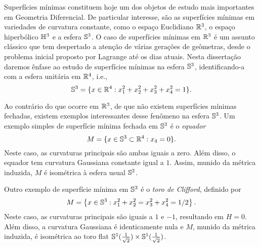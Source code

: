 %

Superf\'icies m\'inimas constituem hoje um dos objetos de estudo
mais importantes em Geometria Diferencial. De particular interesse, 
s\~ao as superf\'icies m\'inimas em variedades de curvatura constante, 
como o espa\c co Euclidiano $\mathbb{R}^3$, o espa\c co hiperb\'olico $\mathbb{H}^3$
e a esfera $\mathbb{S}^3$. O caso de superf\'icies m\'inimas em $\mathbb{R}^3$ \'e um
assunto cl\'assico que tem despertado a aten\c c\~ao de v\'arias 
gera\c c\~oes de ge\^ometras, desde o problema inicial proposto por 
Lagrange at\'e os dias atuais. Nesta disserta\c c\~ao daremos
\^enfase ao estudo de superf\'icies m\'inimas na esfera $\mathbb{S}^3$, 
identificando-a com a esfera unit\'aria em $\mathbb{R}^4$, i.e.,
\[
\mathbb{S}^3=\{x\in\mathbb{R}^4:x_1^2+x_2^2+x_3^2+x_4^2=1\}.
\]



Ao contr\'ario do que ocorre em $\mathbb{R}^3$, de que n\~ao existem 
superf\'icies m\'inimas fechadas, existem exemplos interessantes
desse fen\^omeno na esfera $\mathbb{S}^3$. Um exemplo simples de 
superf\'icie m\'inima fechada em $\mathbb{S}^3$ \'e o {\em equador}
\[
M=\{x\in\mathbb{S}^3\subset\mathbb{R}^4:x_4=0\}.
\]
Neste caso, as curvaturas principais s\~ao ambas iguais a zero. 
Al\'em disso, o equador tem curvatura Gaussiana
constante igual a $1$. Assim, munido da m\'etrica induzida, $M$ \'e
isom\'etrica \`a esfera usual $\mathbb{S}^2$.

Outro exemplo de superf\'icie m\'inima em $\mathbb{S}^3$ \'e o {\em toro de
	Clifford}, definido por
\[
M=\left\{x\in\mathbb{S}^3:x_1^2+x_2^2=x_3^2+x_4^2=1/2\right\}.
\]
Neste caso, as curvaturas principais s\~ao iguais a $1$ e $-1$, 
resultando em $H=0$. Al\'em disso, a curvatura Gaussiana \'e 
identicamente nula e $M$, munido da m\'etrica induzida, \'e 
isom\'etrica ao toro flat 
$\mathbb{S}^1(\frac{1}{\sqrt2})\times\mathbb{S}^1(\frac{1}{\sqrt2})$.

